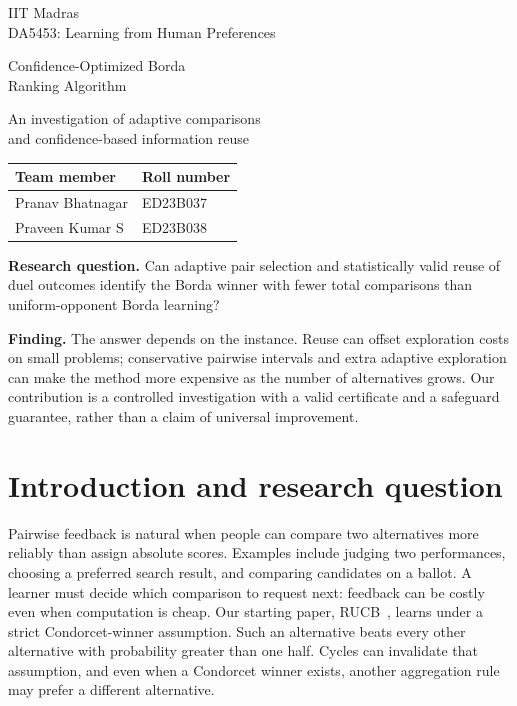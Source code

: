\documentclass[11pt,a4paper]{article}
\begin{document}
\hypersetup{pageanchor=false}
\begin{titlepage}\centering\vspace*{1.0cm}
{\Large IIT Madras\\DA5453: Learning from Human Preferences\par}
\vspace{1.2cm}{\Huge\bfseries COBRA\par}\vspace{.4cm}
{\LARGE Confidence-Optimized Borda\\Ranking Algorithm\par}\vspace{.7cm}
{\Large An investigation of adaptive comparisons\\and confidence-based information reuse\par}
\vspace{1.2cm}
\begin{tabular}{ll}\toprule Team member&Roll number\\\midrule
Pranav Bhatnagar&ED23B037\\Praveen Kumar S&ED23B038\\\bottomrule\end{tabular}
\vfill\begin{minipage}{.88\linewidth}
\textbf{Research question.} Can adaptive pair selection and statistically valid reuse of duel outcomes identify the Borda winner with fewer total comparisons than uniform-opponent Borda learning?

\textbf{Finding.} The answer depends on the instance. Reuse can offset exploration costs on small problems; conservative pairwise intervals and extra adaptive exploration can make the method more expensive as the number of alternatives grows. Our contribution is a controlled investigation with a valid certificate and a safeguard guarantee, rather than a claim of universal improvement.
\end{minipage}\vspace*{1cm}\end{titlepage}
\clearpage\hypersetup{pageanchor=true}
{\small\tableofcontents}\clearpage{}

\section{Introduction and research question}
Pairwise feedback is natural when people can compare two alternatives more reliably than assign absolute scores. Examples include judging two performances, choosing a preferred search result, and comparing candidates on a ballot. A learner must decide which comparison to request next: feedback can be costly even when computation is cheap. Our starting paper, RUCB~\cite{zoghi}, learns under a strict Condorcet-winner assumption. Such an alternative beats every other alternative with probability greater than one half. Cycles can invalidate that assumption, and even when a Condorcet winner exists, another aggregation rule may prefer a different alternative.
\end{document}
